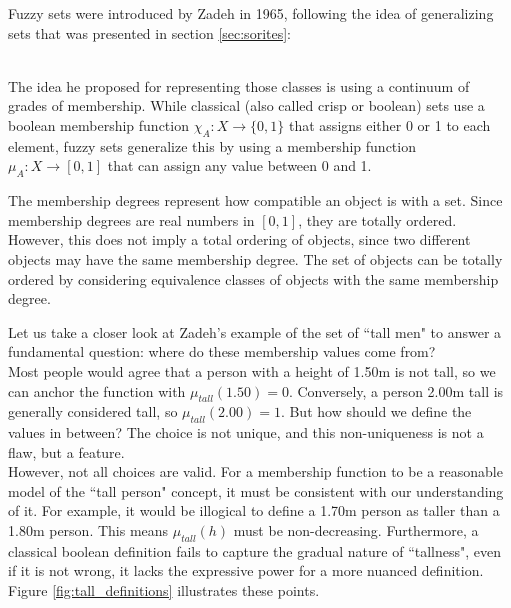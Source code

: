 Fuzzy sets were introduced by Zadeh in 1965, following the idea of generalizing sets that was presented in section \ref{sec:sorites}:

\cite{Zadeh1965}\\

The idea he proposed for representing those classes is using a continuum of grades of membership. While classical (also called crisp or boolean) sets use a boolean membership function $\chi_A:X\rightarrow\{0,1\}$ that assigns either 0 or 1 to each element, fuzzy sets generalize this by using a membership function $\mu_A:X\rightarrow[0,1]$ that can assign any value between 0 and 1. 

\begin{remark}
    The membership degrees represent how compatible an object is with a set. Since membership degrees are real numbers in $[0,1]$, they are totally ordered. However, this does not imply a total ordering of objects, since two different objects may have the same membership degree. The set of objects can be totally ordered by considering equivalence classes of objects with the same membership degree.
\end{remark}

Let us take a closer look at Zadeh's example of the set of ``tall men" to answer a fundamental question: where do these membership values come from?\\

Most people would agree that a person with a height of 1.50m is not tall, so we can anchor the function with $\mu_{tall}(1.50) = 0$. Conversely, a person 2.00m tall is generally considered tall, so $\mu_{tall}(2.00) = 1$. But how should we define the values in between? The choice is not unique, and this non-uniqueness is not a flaw, but a feature.\\

However, not all choices are valid. For a membership function to be a reasonable model of the ``tall person" concept, it must be consistent with our understanding of it. For example, it would be illogical to define a 1.70m person as taller than a 1.80m person. This means $\mu_{tall}(h)$ must be non-decreasing. Furthermore, a classical boolean definition fails to capture the gradual nature of ``tallness", even if it is not wrong, it lacks the expressive power for a more nuanced definition. Figure \ref{fig:tall_definitions} illustrates these points.

